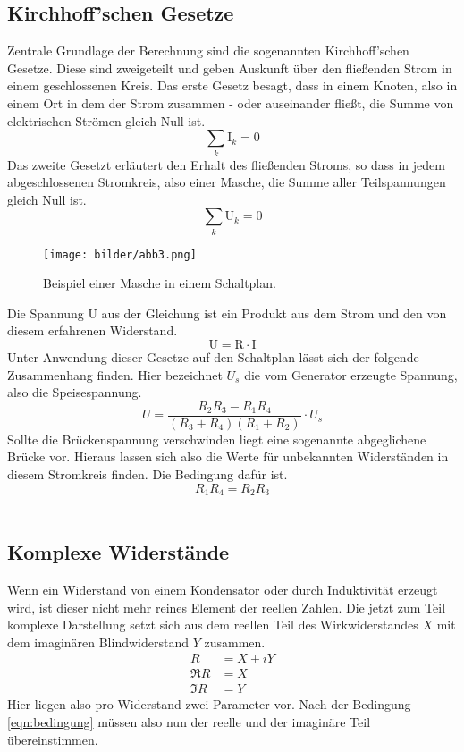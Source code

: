 \subsection{Kirchhoff'schen Gesetze}
Zentrale Grundlage der Berechnung sind die sogenannten Kirchhoff'schen Gesetze. Diese sind zweigeteilt und 
geben Auskunft über den fließenden Strom in einem geschlossenen Kreis.
Das erste Gesetz besagt, dass in einem Knoten, also in einem Ort in dem der Strom zusammen - oder auseinander fließt, 
die Summe von elektrischen Strömen gleich Null ist.
\begin{equation*}
    \sum_k \text{I}_k = 0
\end{equation*}
Das zweite Gesetzt erläutert den Erhalt des fließenden Stroms, so dass in jedem abgeschlossenen Stromkreis, also einer Masche,
die Summe aller Teilspannungen gleich Null ist.
\begin{equation}
    \label{eqn:kirch2}
    \sum_k \text{U}_k = 0
\end{equation}
\begin{figure}
    \centering
    \texttt{[image: bilder/abb3.png]}
    \caption{Beispiel einer Masche in einem Schaltplan. \cite{skript}} 
    \label{fig:abb3}
\end{figure}
Die Spannung U aus der Gleichung ist ein Produkt aus dem Strom und den von diesem erfahrenen Widerstand.
\begin{equation*}
    \text{U} = \text{R}\cdot \text{I}
\end{equation*}
Unter Anwendung dieser Gesetze auf den Schaltplan %
lässt sich der folgende Zusammenhang finden. Hier bezeichnet $U_s$ die vom Generator erzeugte Spannung, also die Speisespannung. 
\begin{equation*}
     U= \frac{R_2R_3 - R_1R_4}{(R_3+R_4)(R_1+R_2)}\cdot U_s
\end{equation*}
Sollte die Brückenspannung verschwinden liegt eine sogenannte abgeglichene Brücke vor. 
Hieraus lassen sich also die Werte für unbekannten Widerständen in diesem Stromkreis finden.
Die Bedingung dafür ist.
\begin{equation}
    \label{eqn:bedingung}
    R_1 R_4 = R_2 R_3
\end{equation}
\\
\newline
\subsection{Komplexe Widerstände}
Wenn ein Widerstand von einem Kondensator oder durch Induktivität erzeugt wird, ist dieser nicht mehr reines 
Element der reellen Zahlen. 
Die jetzt zum Teil komplexe Darstellung setzt sich aus dem reellen Teil des Wirkwiderstandes $X$ mit 
dem imaginären Blindwiderstand $Y$ zusammen. 
\begin{align*}
    R &= X +iY \\
    \Re{R} &= X \\
    \Im{R} &= Y 
\end{align*} 
Hier liegen also pro Widerstand zwei Parameter vor. Nach der Bedingung \eqref{eqn:bedingung} müssen also
nun der reelle und der imaginäre Teil übereinstimmen. 
\\
\newline
